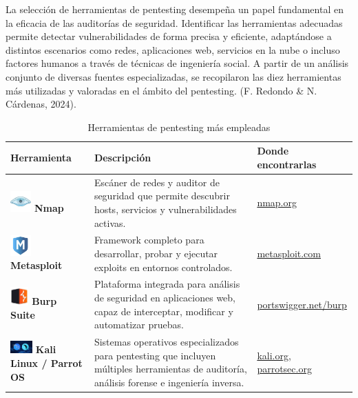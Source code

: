 \documentclass[a4paper, 10pt]{article}
\begin{document}
    La selección de herramientas de pentesting desempeña un papel fundamental en la eficacia de las auditorías de seguridad. Identificar las herramientas adecuadas permite detectar vulnerabilidades de forma precisa y eficiente, adaptándose a distintos escenarios 
    como redes, aplicaciones web, servicios en la nube o incluso factores humanos a través de técnicas de ingeniería social. A partir de un análisis conjunto de diversas fuentes especializadas, se recopilaron las diez herramientas 
    más utilizadas y valoradas en el ámbito del pentesting. (F. Redondo \& N. Cárdenas, 2024). \cite{felipe2024}
    
    \begin{table}[H]
    \caption{Herramientas de pentesting más empleadas}
    \centering
    \begin{tabular}{|m{5cm}|m{8cm}|m{3.5cm}|}
        \hline
        \textbf{Herramienta} & \textbf{Descripción} & \textbf{Donde encontrarlas} \\
        \hline
        \includegraphics[width=0.8cm]{images/nmap.jpeg} \textbf{Nmap} & Escáner de redes y auditor de seguridad que permite descubrir hosts, servicios y vulnerabilidades activas. & \href{https://nmap.org}{nmap.org} \\
        \hline
        \includegraphics[width=0.8cm]{images/metasploit.jpeg} \textbf{Metasploit} & Framework completo para desarrollar, probar y ejecutar exploits en entornos controlados. & \href{https://www.metasploit.com}{metasploit.com} \\
        \hline
        \includegraphics[width=0.7cm]{images/burp.jpeg} \textbf{Burp Suite} & Plataforma integrada para análisis de seguridad en aplicaciones web, capaz de interceptar, modificar y automatizar pruebas. & \href{https://portswigger.net/burp}{portswigger.net/burp} \\
        \hline
        \includegraphics[width=0.85cm]{images/kali.jpeg} \textbf{Kali Linux / Parrot OS} & Sistemas operativos especializados para pentesting que incluyen múltiples herramientas de auditoría, análisis forense e ingeniería inversa. & \href{https://www.kali.org}{kali.org}, \href{https://www.parrotsec.org}{parrotsec.org} \\

\end{tabular}
\end{table}
\end{document}
